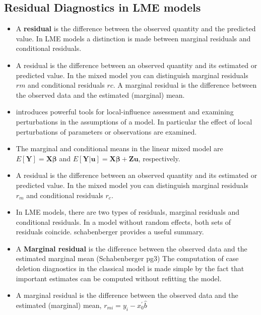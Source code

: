 \documentclass[Main.tex]{subfiles}
\begin{document}
\subsection{Residual Diagnostics in LME models}
\begin{itemize}
\item A \textbf{residual} is the difference between the observed quantity and the predicted value. In LME models a distinction is made between marginal residuals and conditional residuals.

\item A residual is the difference between an observed quantity and its estimated or predicted value. In the mixed
model you can distinguish marginal residuals $rm$ and conditional residuals $rc$. A marginal residual is the
difference between the observed data and the estimated (marginal) mean.

\item \citet{cook86} introduces powerful tools for local-influence
assessment and examining perturbations in the assumptions of a
model. In particular the effect of local perturbations of
parameters or observations are examined.

\item The marginal and conditional means in the linear mixed model are
$E[\boldsymbol{Y}] = \boldsymbol{X}\boldsymbol{\beta}$ and
$E[\boldsymbol{Y|\boldsymbol{u}}] = \boldsymbol{X}\boldsymbol{\beta} + \boldsymbol{Z}\boldsymbol{u}$, respectively.

\item A residual is the difference between an observed quantity and its estimated or predicted value. In the mixed
model you can distinguish marginal residuals $r_m$ and conditional residuals $r_c$. 


	
\item In LME models, there are two types of residuals, marginal residuals and conditional residuals. 
In a model without random effects, both sets of residuals coincide. schabenberger provides a useful summary. 
		
\item A \textbf{Marginal residual} is the difference between the observed data and the estimated marginal mean (Schabenberger  pg3)
The computation of case deletion diagnostics in the classical model is made simple by the fact that important estimates can be computed without refitting the model. 

\item A marginal residual is the
difference between the observed data and the estimated (marginal) mean, $r_{mi} = y_i - x_0^{\prime} \hat{b}$



\end{itemize}
\end{document}
